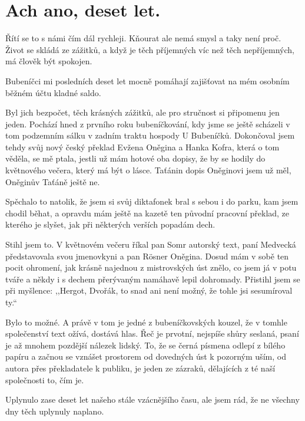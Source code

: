 
\bigskip

\section{Ach ano, deset let.}

\noindent
Řítí se to s námi čím dál rychleji. Kňourat ale nemá smysl a taky není proč. Život se skládá ze zážitků, a když je 
těch příjemných víc než těch nepříjemných, má člověk být spokojen.

Bubeníčci mi posledních deset let mocně pomáhají zajišťovat na mém osobním běžném účtu kladné saldo. 

Byl jich bezpočet, těch krásných zážitků, ale pro stručnost si připomenu jen jeden. Pochází hned z prvního roku bubeníčkování, kdy jsme se ještě scházeli v tom podzemním sálku v zadním traktu hospody U Bubeníčků. Dokončoval jsem tehdy svůj nový český překlad Evžena Oněgina a Hanka Kofra, která o tom věděla, se mě ptala, jestli už mám hotové oba 
dopisy, že by se hodily do květnového večera, který má být o lásce. Taťánin dopis Oněginovi jsem už měl, Oněginův Taťáně ještě ne. 

Spěchalo to natolik, že jsem si svůj diktafonek bral s sebou i do parku, kam jsem chodil běhat, a opravdu mám ještě na kazetě ten původní pracovní překlad, ze kterého je slyšet, jak při některých verších popadám dech. 

Stihl jsem to. V květnovém večeru říkal pan Somr autorský text, paní Medvecká představovala svou jmenovkyni a pan Rösner Oněgina. Dosud mám v sobě ten pocit ohromení, jak krásně najednou z mistrovských úst znělo, co jsem já v potu tváře a někdy i s dechem přerývaným namáhavě lepil dohromady. Přistihl jsem se při myšlence: ,,Hergot, Dvořák, to snad ani není možný, že tohle jsi sesumíroval ty.``

Bylo to možné. A právě v tom je jedné z bubeníčkovských kouzel, že v tomhle společenství text ožívá, dostává hlas. Řeč je prvotní, nejspíše shůry seslaná, psaní je až mnohem pozdější nálezek lidský. To, že se černá písmena odlepí z bílého papíru a začnou se vznášet prostorem od dovedných úst k pozorným uším, od autora přes překladatele k publiku, je jeden ze zázraků, dělajících z té naší společnosti to, čím je.

Uplynulo zase deset let našeho stále vzácnějšího času, ale jsem rád, že ne všechny dny těch uplynuly naplano.


